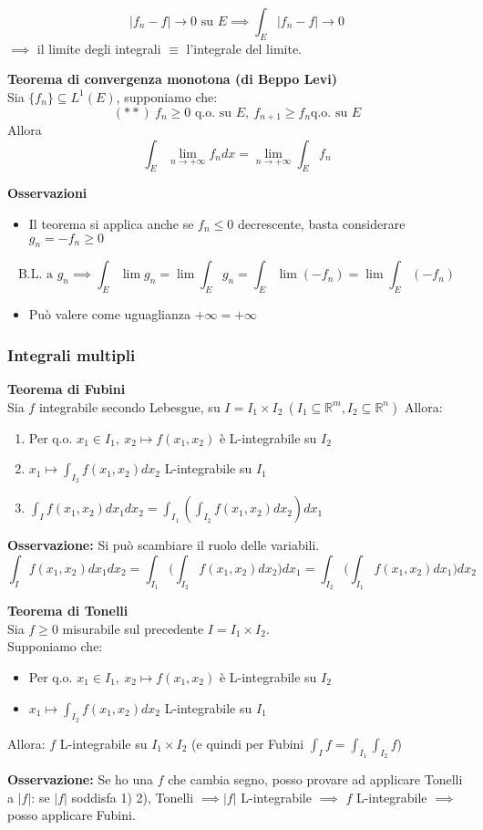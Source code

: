 \documentclass[a4paper]{article}
\newcommand{\R}{\mathbb{R}}
\begin{document}
\[|f_n-f|\to 0\text{ su }E\implies \int_{E}^{} |f_n-f|\to 0\]
$\implies$ il limite degli integrali $\equiv$ l'integrale del limite.
\begin{tcolorbox}
	\textbf{Teorema di convergenza monotona (di Beppo Levi)}
	\\Sia $\{f_n\} \subseteq L^1(E)$, supponiamo che:
	\[(* *)\ f_n\ge 0\text{ q.o. su }E,\ f_{n+1}\ge f_n\text{q.o. su }E\]
	Allora
	\[\int_{E}^{} \lim_{n \to +\infty} f_ndx=\lim_{n \to +\infty} \int_{E}^{} f_n\]  
\end{tcolorbox}
\textbf{Osservazioni} 
\begin{itemize}
	\item Il teorema si applica anche se $f_n\le 0$ decrescente, basta considerare $g_n=-f_n\ge 0$
\end{itemize}
\[\text{B.L. a }g_n\implies \int_{E}^{} \lim g_n=\lim\int_{E}^{}g_n=\int_{E}^{} \lim(-f_n)=\lim \int_{E}^{} (-f_n)\]
\begin{itemize}
	\item Può valere come uguaglianza $+\infty=+\infty$
\end{itemize}
\subsubsection{Integrali multipli}
\begin{tcolorbox}
	\textbf{Teorema di Fubini} 
	\\Sia $f$ integrabile secondo Lebesgue, su $I=I_1\times I_2\ (I_1\subseteq  \R^m, I_2\subseteq\R^n)$
	Allora:
	\begin{enumerate}
		\item Per q.o. $x_1\in I_1,\ x_2\mapsto f(x_1,x_2)$ è L-integrabile su $I_2$
		\item $x_1\mapsto \int_{I_2}^{} f(x_1,x_2)dx_2$ L-integrabile su $I_1$
		\item $\int_{I}^{} f(x_1,x_2)dx_1dx_2=\int_{I_1}^{} ( \int_{I_2}^{} f(x_1,x_2)dx_2)dx_1$  
	\end{enumerate}
\end{tcolorbox}
\textbf{Osservazione:} Si può scambiare il ruolo delle variabili.
\[\int_{I}^{} f(x_1,x_2)dx_1dx_2=\int_{I_1}^{} \bigg(\int_{I_2}^{} f(x_1,x_2)dx_2\bigg)dx_1=\int_{I_2}^{} \bigg(\int_{I_1}^{} f(x_1,x_2)dx_1\bigg)dx_2\]
\begin{tcolorbox}
	\textbf{Teorema di Tonelli} 
	\\Sia $f\ge 0$ misurabile sul precedente $I=I_1\times I_2$.
	\\Supponiamo che:
	\begin{itemize}	
		\item Per q.o. $x_1\in I_1,\ x_2\mapsto f(x_1,x_2)$ è L-integrabile su $I_2$
		\item $x_1\mapsto \int_{I_2}^{} f(x_1,x_2)dx_2$ L-integrabile su $I_1$
	\end{itemize}
	Allora: $f$ L-integrabile su $I_1\times I_2$ (e quindi per Fubini $\int_{I}^{} f=\int_{I_1}^{} \int_{I_2}^{} f$)   
\end{tcolorbox}
\textbf{Osservazione:} Se ho una $f$ che cambia segno, posso provare ad applicare Tonelli a $|f|$: se $|f|$ soddisfa 1) 2), Tonelli $\implies |f|$ L-integrabile $\implies$ $f$ L-integrabile $\implies$ posso applicare Fubini. 
\end{document}
